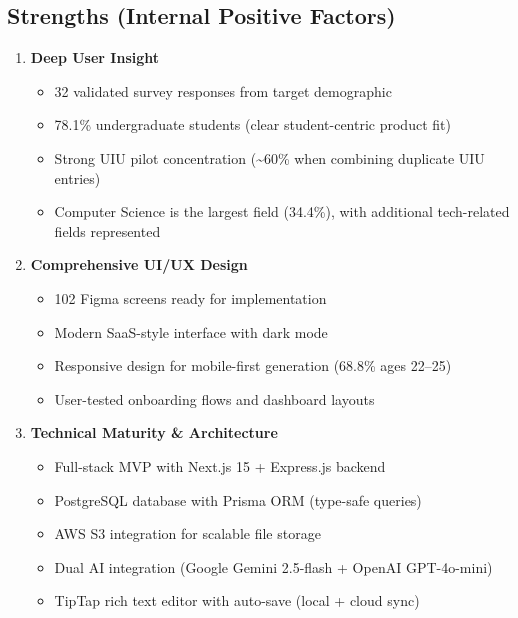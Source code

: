 \subsection{Strengths (Internal Positive Factors)}

\begin{enumerate}
    \item \textbf{Deep User Insight}
          \begin{itemize}
              \item 32 validated survey responses from target demographic
              \item 78.1\% undergraduate students (clear student-centric product fit)
              \item Strong UIU pilot concentration (\textasciitilde{}60\% when combining duplicate UIU entries)
              \item Computer Science is the largest field (34.4\%), with additional tech-related fields represented
          \end{itemize}

    \item \textbf{Comprehensive UI/UX Design}
          \begin{itemize}
              \item 102 Figma screens ready for implementation
              \item Modern SaaS-style interface with dark mode
              \item Responsive design for mobile-first generation (68.8\% ages 22--25)
              \item User-tested onboarding flows and dashboard layouts
          \end{itemize}

    \item \textbf{Technical Maturity \& Architecture}
          \begin{itemize}
              \item Full-stack MVP with Next.js 15 + Express.js backend
              \item PostgreSQL database with Prisma ORM (type-safe queries)
              \item AWS S3 integration for scalable file storage
              \item Dual AI integration (Google Gemini 2.5-flash + OpenAI GPT-4o-mini)
              \item TipTap rich text editor with auto-save (local + cloud sync)
          \end{itemize}


\end{enumerate}

